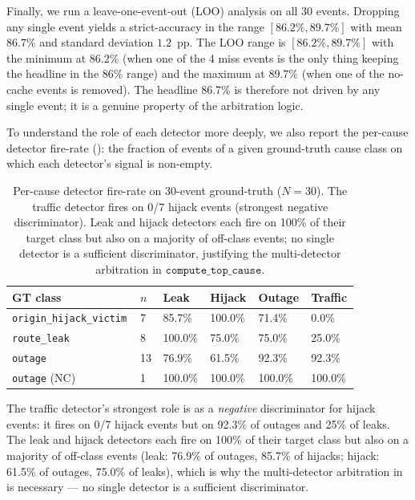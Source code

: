 Finally, we run a leave-one-event-out (LOO) analysis
on all 30 events. Dropping any single event
yields a strict-accuracy in the range
$[86.2\%, 89.7\%]$ with mean $86.7\%$ and standard
deviation $1.2$~pp. The LOO range is $[86.2\%, 89.7\%]$
with the minimum at 86.2\% (when one of the 4 miss
events is the only thing keeping the headline in the
86\% range) and the maximum at 89.7\% (when one of
the no-cache events is removed). The headline 86.7\%
is therefore not driven by any single event; it is a
genuine property of the arbitration logic.

To understand the role of each detector more deeply,
we also report the per-cause detector fire-rate
(): the fraction of
events of a given ground-truth cause class on which
each detector's signal is non-empty.

\begin{table}[t]
\centering
\small
\setlength{\tabcolsep}{3pt}
\begin{tabular}{p{0.30\linewidth}p{0.04\linewidth}p{0.13\linewidth}p{0.13\linewidth}p{0.13\linewidth}p{0.13\linewidth}}
\hline
GT class & $n$ & Leak & Hijack & Outage & Traffic \\ \hline
\texttt{origin\_hijack\_victim} & 7 & 85.7\% & 100.0\% & 71.4\% & 0.0\% \\
\texttt{route\_leak} & 8 & 100.0\% & 75.0\% & 75.0\% & 25.0\% \\
\texttt{outage} & 13 & 76.9\% & 61.5\% & 92.3\% & 92.3\% \\
\texttt{outage} (NC) & 1 & 100.0\% & 100.0\% & 100.0\% & 100.0\% \\ \hline
\end{tabular}
\caption{Per-cause detector fire-rate on 30-event ground-truth ($N{=}30$). The traffic detector fires on 0/7 hijack events (strongest negative discriminator). Leak and hijack detectors each fire on 100\% of their target class but also on a majority of off-class events; no single detector is a sufficient discriminator, justifying the multi-detector arbitration in $\mathtt{compute\_top\_cause}$.}
\label{tab:detector-fire}
\end{table}

The traffic detector's strongest role is as a
\emph{negative} discriminator for hijack events: it
fires on 0/7 hijack events but on 92.3\% of outages
and 25\% of leaks. The leak and hijack detectors each
fire on 100\% of their target class but also on a
majority of off-class events (leak: 76.9\% of
outages, 85.7\% of hijacks; hijack: 61.5\% of
outages, 75.0\% of leaks), which is why the
multi-detector arbitration in
is necessary --- no single detector is a sufficient
discriminator.

